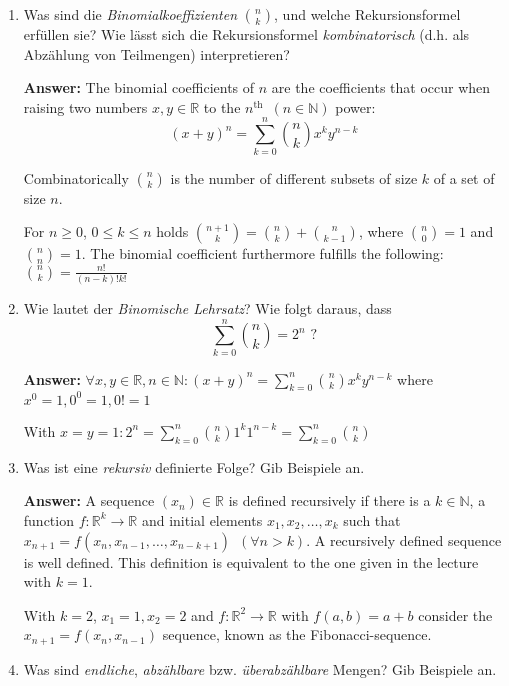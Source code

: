 \documentclass[11pt]{article}
\newcommand{\sumn}[4]{\sum_{#1=#2}^{#3}{#4}}
\newcommand{\RR}[0]{\mathbb{R}}
\begin{document}
\begin{enumerate}
    \item Was sind die \textit{Binomialkoeffizienten} $\binom{n}{k}$, und welche Rekursionsformel erfüllen sie? Wie lässt sich die Rekursionsformel \textit{kombinatorisch} (d.h. als Abzählung von Teilmengen) interpretieren?

    \textbf{Answer:}
    The binomial coefficients of $n$ are the coefficients that occur when raising two numbers $x, y \in \mathbb{R}$ to the $n^\text{th}\phantom{0}(n\in \mathbb{N})$ power:
    $$(x+y)^n = \sum_{k=0}^n {\binom{n}{k}x^k y^{n-k}}$$

    Combinatorically $\binom{n}{k}$ is the number of different subsets of size $k$ of a set of size $n$.

    For $n \ge 0$, $0 \le k \le n$ holds $\binom{n+1}{k} = \binom{n}{k} + \binom{n}{k-1}$, where $\binom{n}{0} = 1$ and $\binom{n}{n} = 1$. The binomial coefficient furthermore fulfills the following: $\binom{n}{k} = \frac{n!}{(n-k)! k!}$


    \item Wie lautet der \textit{Binomische Lehrsatz}? Wie folgt daraus, dass
    $$\sumn{k}{0}{n}{\binom{n}{k}} = 2^n\text{ ?}$$

    \textbf{Answer:} $\forall x, y \in \mathbb{R}, n\in\mathbb{N}\colon (x+y)^n = \sum_{k=0}^n {\binom{n}{k}x^k y^{n-k}}$ where $x^0 = 1, 0^0 = 1, 0! = 1$
    
    With $x = y = 1\colon 2^n = \sum_{k=0}^n {\binom{n}{k}1^k 1^{n-k}} = \sum_{k=0}^n {\binom{n}{k}}$
    

    \item Was ist eine \textit{rekursiv} definierte Folge? Gib Beispiele an.

    \textbf{Answer:} A sequence $(x_n) \in \mathbb{R}$ is defined recursively if there is a $k \in \mathbb{N}$, a function $f\colon \mathbb{R}^k \to \mathbb{R}$ and initial elements $x_1, x_2, \dots, x_k$ such that $x_{n+1} = f(x_n, x_{n-1}, \dots, x_{n - k + 1})\phantom{0}(\forall n > k)$. A recursively defined sequence is well defined. This definition is equivalent to the one given in the lecture with $k=1$.
    
    With $k = 2$, $x_1 = 1, x_2 = 2$ and $f\colon \RR^2 \to \RR$ with $f(a, b) = a + b$ consider the $x_{n+1} = f(x_n, x_{n-1})$ sequence, known as the Fibonacci-sequence.

    \item Was sind \textit{endliche}, \textit{abzählbare} bzw. \textit{überabzählbare} Mengen? Gib Beispiele an.


\end{enumerate}
\end{document}
